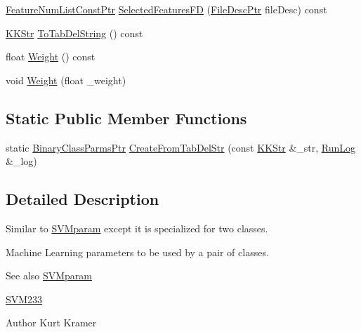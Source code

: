 \begin{DoxyCompactItemize}
\item 
\hyperlink{namespace_k_k_m_l_l_a81284b0a14973267260023f9a72da94a}{Feature\+Num\+List\+Const\+Ptr} \hyperlink{class_k_k_m_l_l_1_1_binary_class_parms_aebdec3c0e91497ba4937543368a6a899}{Selected\+Features\+FD} (\hyperlink{namespace_k_k_m_l_l_aa0d0b6ab4ec18868a399b8455b05d914}{File\+Desc\+Ptr} file\+Desc) const 
\item 
\hyperlink{class_k_k_b_1_1_k_k_str}{K\+K\+Str} \hyperlink{class_k_k_m_l_l_1_1_binary_class_parms_a595ded088f2391d3c44222b71d92c4e5}{To\+Tab\+Del\+String} () const 
\item 
float \hyperlink{class_k_k_m_l_l_1_1_binary_class_parms_a8756aba72d7881f019f65762441d75b8}{Weight} () const 
\item 
void \hyperlink{class_k_k_m_l_l_1_1_binary_class_parms_a11bf64bbbff5de01eeaabf50e9253a4a}{Weight} (float \+\_\+weight)
\end{DoxyCompactItemize}
\subsection*{Static Public Member Functions}
\begin{DoxyCompactItemize}
\item 
static \hyperlink{class_k_k_m_l_l_1_1_binary_class_parms_a97baab4d7e51018b31648a2f5a36a988}{Binary\+Class\+Parms\+Ptr} \hyperlink{class_k_k_m_l_l_1_1_binary_class_parms_ab52b04650c3739c209b589285dbea5d1}{Create\+From\+Tab\+Del\+Str} (const \hyperlink{class_k_k_b_1_1_k_k_str}{K\+K\+Str} \&\+\_\+str, \hyperlink{class_k_k_b_1_1_run_log}{Run\+Log} \&\+\_\+log)
\end{DoxyCompactItemize}


\subsection{Detailed Description}
Similar to \hyperlink{class_k_k_m_l_l_1_1_s_v_mparam}{S\+V\+Mparam} except it is specialized for two classes. 

Machine Learning parameters to be used by a pair of classes.

\begin{DoxySeeAlso}{See also}
\hyperlink{class_k_k_m_l_l_1_1_s_v_mparam}{S\+V\+Mparam} 

\hyperlink{namespace_s_v_m233}{S\+V\+M233}
\end{DoxySeeAlso}
\begin{DoxyAuthor}{Author}
Kurt Kramer
\end{DoxyAuthor}

